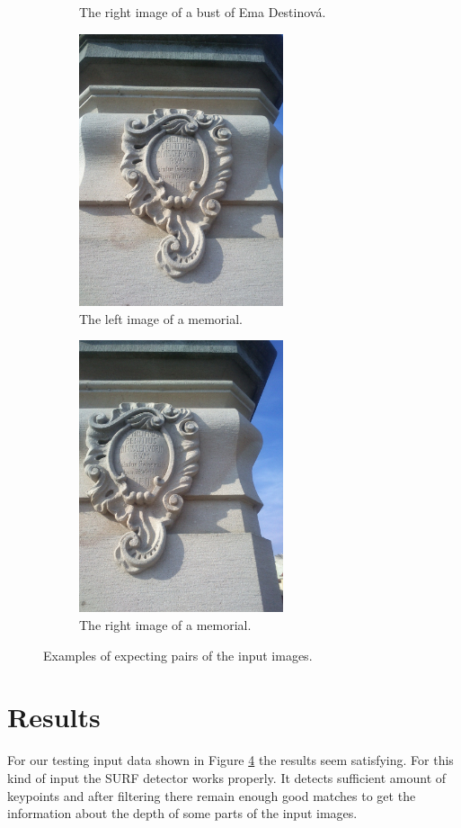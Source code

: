 \begin{figure}[H]
\begin{subfigure}[b]{0.45\textwidth}
\caption{The right image of a bust of Ema Destinová.} \label{2}
\end{subfigure}
\begin{subfigure}[b]{0.45\textwidth}
\centering
\includegraphics[width=6.0cm]{img/memorial_a.png}
\caption{The left image of a memorial.} \label{3}
\end{subfigure}
\begin{subfigure}[b]{0.45\textwidth}
\centering
\includegraphics[width=6.0cm]{img/memorial_b.png}
\caption{The right image of a memorial.} \label{4}
\end{subfigure}

\caption[]{Examples of expecting pairs of the input images.} 
\label{fig:input_samples}
\end{figure}


\section{Results}
For our testing input data shown in Figure \ref{fig:input_samples} the results seem satisfying.
For this kind of input the SURF detector works properly.
It detects sufficient amount of keypoints and after filtering there remain enough good matches to get the information about the depth of some parts of the input images.

